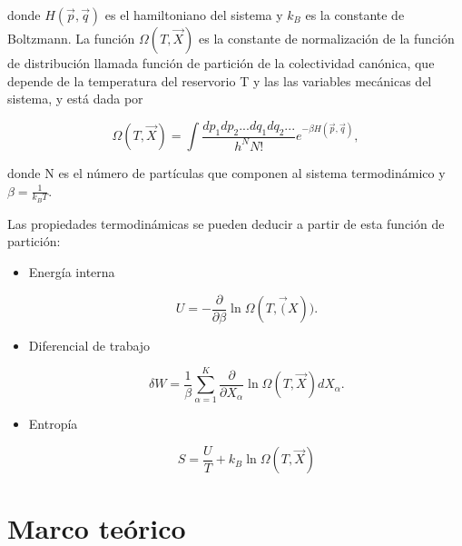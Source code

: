 \documentclass[letterpaper,12pt,oneside]{book}
\begin{document}
	\noindent donde $H(\vec{p}, \vec{q})$ es el hamiltoniano del sistema y  $k_B$ es la constante de Boltzmann. La funci\'on $\Omega(T, \vec{X})$ es la constante de normalizaci\'on de la funci\'on de distribuci\'on llamada funci\'on de partici\'on de la colectividad can\'onica, que depende de la temperatura del reservorio T y las las variables mec\'anicas del sistema, y est\'a dada por
	
	\begin{equation}
		\Omega(T, \vec{X}) = \int \frac{dp_1 dp_2 ... dq_1 dq_2...}{h^NN!} e^{-\beta H(\vec{p}, \vec{q})}, 
	\end{equation}
	
	\noindent donde N es el n\'umero de part\'iculas que componen al sistema termodin\'amico y $\beta = \frac{1}{k_BT}$.
	
	Las propiedades termodin\'amicas se pueden deducir a partir de esta funci\'on de partici\'on:
	
	\begin{itemize}
		\item Energ\'ia interna
		
		\begin{equation}
			U = -\frac{\partial}{\partial \beta} \ln\Omega(T, \vec(X)).
		\end{equation}
		
		\item Diferencial de trabajo
		
		\begin{equation}
			\delta W = \frac{1}{\beta}\sum_{\alpha=1}^K\frac{\partial}{\partial X_{\alpha}}\ln\Omega(T, \vec{X})dX_\alpha.
		\end{equation}
		
		\item Entrop\'ia
		
		\begin{equation}
			S = \frac{U}{T} + k_B\ln\Omega(T, \vec{X})
		\end{equation}
	\end{itemize}	
	
	
	
	
	
	
	
	\chapter{Marco te\'orico}
	
\end{document}
